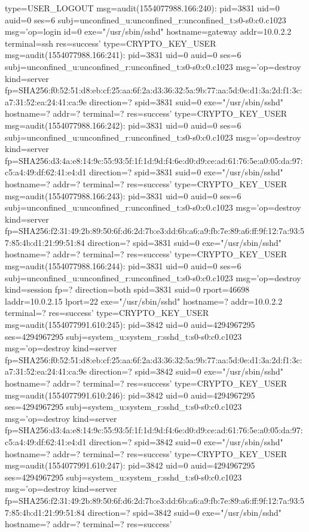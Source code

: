\documentclass[]{report}
\newenvironment{Shaded}{}{}
\newcommand{\NormalTok}[1]{#1}
\begin{document}
\begin{Shaded}
\begin{Highlighting}[]
\NormalTok{type=USER_LOGOUT msg=audit(1554077988.166:240): pid=3831 uid=0 auid=0 ses=6 subj=unconfined_u:unconfined_r:unconfined_t:s0-s0:c0.c1023 msg='op=login id=0 exe="/usr/sbin/sshd" hostname=gateway addr=10.0.2.2 terminal=ssh res=success'}
\NormalTok{type=CRYPTO_KEY_USER msg=audit(1554077988.166:241): pid=3831 uid=0 auid=0 ses=6 subj=unconfined_u:unconfined_r:unconfined_t:s0-s0:c0.c1023 msg='op=destroy kind=server fp=SHA256:f0:52:51:d8:eb:cf:25:aa:6f:2a:d3:36:32:5a:9b:77:aa:5d:0e:d1:3a:2d:f1:3c:a7:31:52:ea:24:41:ca:9e direction=? spid=3831 suid=0  exe="/usr/sbin/sshd" hostname=? addr=? terminal=? res=success'}
\NormalTok{type=CRYPTO_KEY_USER msg=audit(1554077988.166:242): pid=3831 uid=0 auid=0 ses=6 subj=unconfined_u:unconfined_r:unconfined_t:s0-s0:c0.c1023 msg='op=destroy kind=server fp=SHA256:d3:4a:e8:14:9c:55:93:5f:1f:1d:9d:f4:6e:d0:d9:ce:ad:61:76:5e:a0:05:da:97:c5:a4:49:df:62:41:e4:d1 direction=? spid=3831 suid=0  exe="/usr/sbin/sshd" hostname=? addr=? terminal=? res=success'}
\NormalTok{type=CRYPTO_KEY_USER msg=audit(1554077988.166:243): pid=3831 uid=0 auid=0 ses=6 subj=unconfined_u:unconfined_r:unconfined_t:s0-s0:c0.c1023 msg='op=destroy kind=server fp=SHA256:f2:31:49:2b:89:50:6f:d6:2d:7b:e3:dd:6b:a6:a9:fb:7e:89:a6:ff:9f:12:7a:93:57:85:4b:d1:21:99:51:84 direction=? spid=3831 suid=0  exe="/usr/sbin/sshd" hostname=? addr=? terminal=? res=success'}
\NormalTok{type=CRYPTO_KEY_USER msg=audit(1554077988.166:244): pid=3831 uid=0 auid=0 ses=6 subj=unconfined_u:unconfined_r:unconfined_t:s0-s0:c0.c1023 msg='op=destroy kind=session fp=? direction=both spid=3831 suid=0 rport=46698 laddr=10.0.2.15 lport=22  exe="/usr/sbin/sshd" hostname=? addr=10.0.2.2 terminal=? res=success'}
\NormalTok{type=CRYPTO_KEY_USER msg=audit(1554077991.610:245): pid=3842 uid=0 auid=4294967295 ses=4294967295 subj=system_u:system_r:sshd_t:s0-s0:c0.c1023 msg='op=destroy kind=server fp=SHA256:f0:52:51:d8:eb:cf:25:aa:6f:2a:d3:36:32:5a:9b:77:aa:5d:0e:d1:3a:2d:f1:3c:a7:31:52:ea:24:41:ca:9e direction=? spid=3842 suid=0  exe="/usr/sbin/sshd" hostname=? addr=? terminal=? res=success'}
\NormalTok{type=CRYPTO_KEY_USER msg=audit(1554077991.610:246): pid=3842 uid=0 auid=4294967295 ses=4294967295 subj=system_u:system_r:sshd_t:s0-s0:c0.c1023 msg='op=destroy kind=server fp=SHA256:d3:4a:e8:14:9c:55:93:5f:1f:1d:9d:f4:6e:d0:d9:ce:ad:61:76:5e:a0:05:da:97:c5:a4:49:df:62:41:e4:d1 direction=? spid=3842 suid=0  exe="/usr/sbin/sshd" hostname=? addr=? terminal=? res=success'}
\NormalTok{type=CRYPTO_KEY_USER msg=audit(1554077991.610:247): pid=3842 uid=0 auid=4294967295 ses=4294967295 subj=system_u:system_r:sshd_t:s0-s0:c0.c1023 msg='op=destroy kind=server fp=SHA256:f2:31:49:2b:89:50:6f:d6:2d:7b:e3:dd:6b:a6:a9:fb:7e:89:a6:ff:9f:12:7a:93:57:85:4b:d1:21:99:51:84 direction=? spid=3842 suid=0  exe="/usr/sbin/sshd" hostname=? addr=? terminal=? res=success'}

\end{Highlighting}
\end{Shaded}
\end{document}

